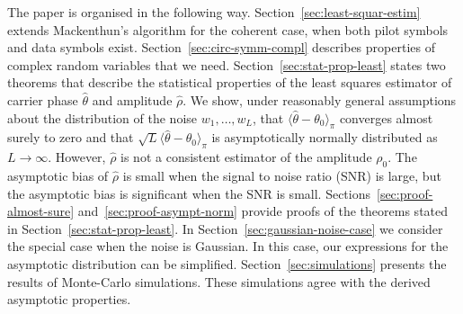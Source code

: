 \documentclass[draftcls, onecolumn, 11pt]{IEEEtran}
\begin{document}
The paper is organised in the following way.  Section~\ref{sec:least-squar-estim} extends Mackenthun's algorithm for the coherent case, when both pilot symbols and data symbols exist.  Section~\ref{sec:circ-symm-compl} describes properties of complex random variables that we need.  Section~\ref{sec:stat-prop-least} states two theorems that describe the statistical properties of the least squares estimator of carrier phase $\hat{\theta}$ and amplitude $\hat{\rho}$.  We show, under reasonably general assumptions about the distribution of the noise $w_1,\dots,w_L$, that $\langle\hat{\theta} - \theta_0\rangle_\pi$ converges almost surely to zero and that $\sqrt{L}\langle\hat{\theta} - \theta_0\rangle_\pi$ is asymptotically normally distributed as $L\rightarrow \infty$.  However, $\hat{\rho}$ is not a consistent estimator of the amplitude $\rho_0$.  The asymptotic bias of $\hat{\rho}$ is small when the signal to noise ratio (SNR) is large, but the asymptotic bias is significant when the SNR is small.  Sections~\ref{sec:proof-almost-sure} and~\ref{sec:proof-asympt-norm} provide proofs of the theorems stated in Section~\ref{sec:stat-prop-least}.  In Section~\ref{sec:gaussian-noise-case} we consider the special case when the noise is Gaussian.  In this case, our expressions for the asymptotic distribution can be simplified.  Section~\ref{sec:simulations} presents the results of Monte-Carlo simulations.  These simulations agree with the derived asymptotic properties. 

\end{document}
